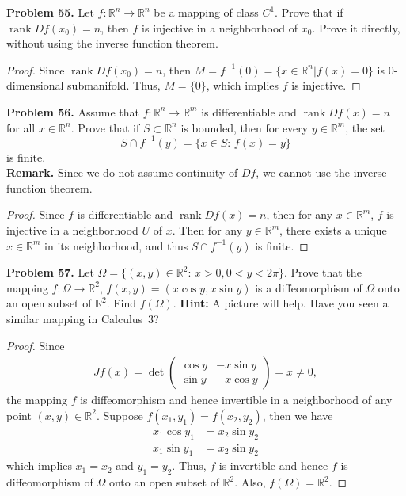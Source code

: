 \documentclass[12pt,leqno]{amsart}
\theoremstyle{definition}
\begin{document}
\medskip

\noindent
{\bf Problem 55.}
Let $f:\mathbb{R}^n\to\mathbb{R}^n$ be a mapping of class $C^1$. Prove that if $\operatorname{rank} Df(x_0)=n$, then $f$ is injective in a neighborhood of $x_0$. Prove it directly, without using the inverse function theorem.
\begin{proof}
Since $\operatorname{rank} Df(x_0) = n$, then $M = f^{-1}(0) = \{x \in \mathbb{R}^n | f(x) = 0\}$ is $0$-dimensional submanifold. Thus, $M = \{0\}$, which implies $f$ is injective.
\end{proof}

\medskip

\noindent
{\bf Problem 56.}
Assume that $f:\mathbb{R}^n\to\mathbb{R}^m$ is differentiable and $\operatorname{rank} Df(x)=n$ for all $x\in\mathbb{R}^n$. Prove that if $S\subset\mathbb{R}^n$ is bounded, then for every $y\in\mathbb{R}^m$, the set
$$
S\cap f^{-1}(y)=\{x\in S:\, f(x)=y\}
$$
is finite.\\
{\bf Remark.} Since we do not assume continuity of $Df$, we cannot use the inverse function theorem.
\begin{proof}
Since $f$ is differentiable and $\operatorname{rank} Df(x) = n$, then for any $x\in \mathbb{R}^m$, $f$ is injective in a neighborhood $U$ of $x$. Then for any $y\in \mathbb{R}^m$, there exists a unique $x \in \mathbb{R}^m$ in its neighborhood, and thus $S\cap f^{-1}(y)$ is finite.
\end{proof}

\medskip

\noindent
{\bf Problem 57.}
Let $\Omega=\{(x,y)\in\mathbb{R}^2:\, x>0, 0<y<2\pi\}$.
Prove that the mapping $f:\Omega\to\mathbb{R}^2$,
$f(x,y)=(x\cos y,x\sin y)$ is a diffeomorphism of $\Omega$
onto an open subset of $\mathbb{R}^2$. Find $f(\Omega)$.
{\bf Hint:} A picture will help. Have you seen a similar mapping in Calculus~3?
\begin{proof}
Since
\begin{align*}
    Jf(x) = \det \begin{pmatrix}
        \cos y & -x \sin y \\
        \sin y & -x \cos y
    \end{pmatrix} = x \neq 0,
\end{align*}
the mapping $f$ is diffeomorphism and hence invertible in a neighborhood of any point $(x,y) \in \mathbb{R}^2$. Suppose $f(x_1, y_1) = f(x_2, y_2)$, then we have
\begin{align*}
    x_1 \cos y_1 & = x_2 \sin y_2 \\
    x_1 \sin y_1 & = x_2 \sin y_2
\end{align*}
which implies $x_1 = x_2$ and $y_1 = y_2$. Thus, $f$ is invertible and hence $f$ is diffeomorphism of $\Omega$ onto an open subset of $\mathbb{R}^2$. Also, $f(\Omega) = \mathbb{R}^2$.
\end{proof}
\end{document}
